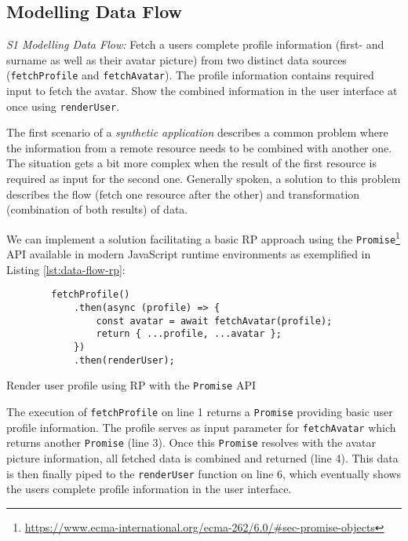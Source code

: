 \documentclass[12pt,a4paper]{article}
\begin{document}
\subsection{Modelling Data Flow}

\begin{framed}
	\noindent\emph{S1 Modelling Data Flow:} Fetch a users complete profile information (first- and surname as well as their avatar picture) from two distinct data sources (\texttt{fetchProfile} and \texttt{fetchAvatar}). The profile information contains required input to fetch the avatar. Show the combined information in the user interface at once using \texttt{renderUser}.
\end{framed}

The first scenario of a \emph{synthetic application} \cite{7827078} describes a common problem where the information from a remote resource needs to be combined with another one. The situation gets a bit more complex when the result of the first resource is required as input for the second one. Generally spoken, a solution to this problem describes the flow (fetch one resource after the other) and transformation (combination of both results) of data.

We can implement a solution facilitating a basic RP approach using the \texttt{Promise}\footnote{\url{https://www.ecma-international.org/ecma-262/6.0/\#sec-promise-objects}} API available in modern JavaScript runtime environments as exemplified in Listing \ref{lst:data-flow-rp}:

\begin{listing}[H]
	\begin{verbatim}
		fetchProfile()
			.then(async (profile) => {
				const avatar = await fetchAvatar(profile);
				return { ...profile, ...avatar };
			})
			.then(renderUser);
	\end{verbatim}
	\caption{Render user profile using RP with the \texttt{Promise} API}
	\label{lst:data-flow-rp}
\end{listing}

The execution of \texttt{fetchProfile} on line 1 returns a \texttt{Promise} providing basic user profile information. The profile serves as input parameter for \texttt{fetchAvatar} which returns another \texttt{Promise} (line 3). Once this \texttt{Promise} resolves with the avatar picture information, all fetched data is combined and returned (line 4). This data is then finally piped to the \texttt{renderUser} function on line 6, which eventually shows the users complete profile information in the user interface.
\end{document}
